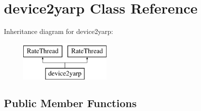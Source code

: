 \hypertarget{classdevice2yarp}{\section{device2yarp Class Reference}
\label{classdevice2yarp}
}
Inheritance diagram for device2yarp\-:\begin{figure}[H]
\begin{center}
\leavevmode
\includegraphics[height=2.000000cm]{classdevice2yarp}
\end{center}
\end{figure}
\subsection*{Public Member Functions}
